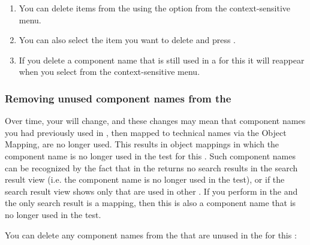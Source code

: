 \begin{enumerate}
\item You can delete items from the \gdomeditor using the  option from the context-sensitive menu.
\item You can also select the item you want to delete and press .
\item If you delete a component name that is still used in a \gdcase{} for this \gdsuite{}  it will reappear  when you select  from the context-sensitive menu.
\end{enumerate}


\subsubsection{Removing unused component names from the \gdomeditor{}}
\label{TasksOMCleanup}

Over time, your \gdproject{} will change, and these changes may mean that component names you had previously used in \gdsuites{}, then mapped to technical names via the Object Mapping, are no longer used. This results in object mappings in which the component name is no longer used in the test for this \gdaut{}. Such component names can be recognized by the fact that  in the \gdomeditor{}  returns no search results in the search result view (i.e. the component name is no longer used in the test), or if the search result view shows only \gdcases{} that are used in other \gdauts{}. If you perform  in the \gdcompnamebrowser{}  and the only search result is a mapping, then this is also a component name that is no longer used in the test. 

You can delete any component names from the \gdomeditor{} that are unused in the \gdproject{} for this \gdaut{}:

